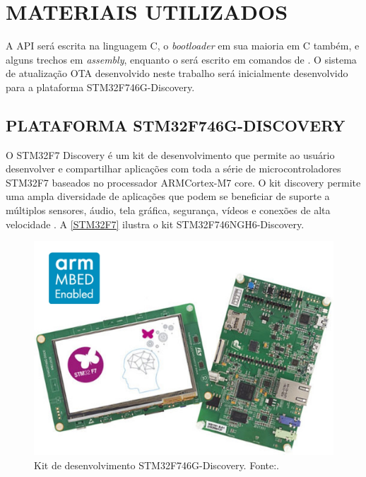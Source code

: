 \section{MATERIAIS UTILIZADOS}

A API será escrita na linguagem C, o \textit{bootloader} em sua maioria em C também, e alguns trechos em \textit{assembly}, enquanto o \linker será escrito em comandos de \linker. O sistema de atualização OTA desenvolvido neste trabalho será inicialmente desenvolvido para a plataforma STM32F746G-Discovery.

\subsection{PLATAFORMA STM32F746G-DISCOVERY}

O STM32F7 Discovery é um kit de desenvolvimento que permite ao usuário desenvolver e compartilhar aplicações com toda a série de microcontroladores STM32F7 baseados no processador ARM\textregistered  Cortex\textregistered-M7 core.
O kit discovery permite uma ampla diversidade de aplicações que podem se beneficiar de suporte a múltiplos sensores, áudio, tela gráfica, segurança, vídeos e conexões de alta velocidade \cite{STM32F7}.
A \autoref{STM32F7} ilustra o kit STM32F746NGH6-Discovery.

\begin{figure}[H]
    \scriptsize
     \centering
     \includegraphics[scale=0.4]{dados/figuras/STM32F7.jpg}
     \caption{Kit de desenvolvimento STM32F746G-Discovery. \newline Fonte:\cite{STM32F7}.}
     \label{STM32F7}
\end{figure}

